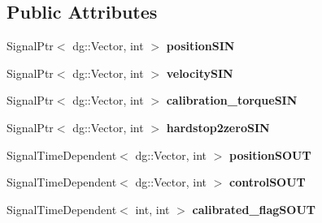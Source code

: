 \subsection*{Public Attributes}
\begin{DoxyCompactItemize}
\item 
Signal\+Ptr$<$ dg\+::\+Vector, int $>$ {\bfseries position\+S\+IN}\hypertarget{classdynamicgraph_1_1sot_1_1Calibrator_aa369e7dad9fe8da29dd945167a0857da}{}\label{classdynamicgraph_1_1sot_1_1Calibrator_aa369e7dad9fe8da29dd945167a0857da}

\item 
Signal\+Ptr$<$ dg\+::\+Vector, int $>$ {\bfseries velocity\+S\+IN}\hypertarget{classdynamicgraph_1_1sot_1_1Calibrator_a36071e191e5c927f9924f9dafb0280cb}{}\label{classdynamicgraph_1_1sot_1_1Calibrator_a36071e191e5c927f9924f9dafb0280cb}

\item 
Signal\+Ptr$<$ dg\+::\+Vector, int $>$ {\bfseries calibration\+\_\+torque\+S\+IN}\hypertarget{classdynamicgraph_1_1sot_1_1Calibrator_ac63fe95057caab918a6ad587395f11b3}{}\label{classdynamicgraph_1_1sot_1_1Calibrator_ac63fe95057caab918a6ad587395f11b3}

\item 
Signal\+Ptr$<$ dg\+::\+Vector, int $>$ {\bfseries hardstop2zero\+S\+IN}\hypertarget{classdynamicgraph_1_1sot_1_1Calibrator_a4f14e6ce28f4be482252d30120bca57b}{}\label{classdynamicgraph_1_1sot_1_1Calibrator_a4f14e6ce28f4be482252d30120bca57b}

\item 
Signal\+Time\+Dependent$<$ dg\+::\+Vector, int $>$ {\bfseries position\+S\+O\+UT}\hypertarget{classdynamicgraph_1_1sot_1_1Calibrator_a5f810140ba967a3d831234f2637dbad2}{}\label{classdynamicgraph_1_1sot_1_1Calibrator_a5f810140ba967a3d831234f2637dbad2}

\item 
Signal\+Time\+Dependent$<$ dg\+::\+Vector, int $>$ {\bfseries control\+S\+O\+UT}\hypertarget{classdynamicgraph_1_1sot_1_1Calibrator_aa8312efc0aa32c548e34b58fdfcaabf2}{}\label{classdynamicgraph_1_1sot_1_1Calibrator_aa8312efc0aa32c548e34b58fdfcaabf2}

\item 
Signal\+Time\+Dependent$<$ int, int $>$ {\bfseries calibrated\+\_\+flag\+S\+O\+UT}\hypertarget{classdynamicgraph_1_1sot_1_1Calibrator_a91b310f62669e4fd925aab8bcb27321f}{}\label{classdynamicgraph_1_1sot_1_1Calibrator_a91b310f62669e4fd925aab8bcb27321f}

\end{DoxyCompactItemize}
